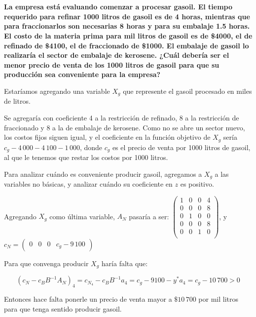 \documentclass[10pt,a4paper]{article}
\begin{document}
		\section{} %
		\textbf{La empresa está evaluando comenzar a procesar gasoil. El tiempo requerido para refinar 1000 litros de gasoil es de 4 horas, mientras que para fraccionarlos son necesarias 8 horas y para su embalaje 1.5 horas. El costo de la materia prima para mil litros de gasoil es de \$4000, el de refinado de \$4100, el de fraccionado de \$1000. El embalaje de gasoil lo realizaría el sector de embalaje de kerosene. ¿Cuál debería ser el menor precio de venta de los 1000 litros de gasoil para que su producción sea conveniente para la empresa?}
		
		\vspace{5mm}
		
		Estaríamos agregando una variable $X_g$ que represente el gasoil procesado en miles de litros.
		
		Se agregaría con coeficiente 4 a la restricción de refinado, 8 a la restricción de fraccionado y 8 a la de embalaje de kerosene. Como no se abre un sector nuevo, los costos fijos siguen igual, y el coeficiente en la función objetivo de $X_g$ sería $c_g - 4\,000 - 4\,100 - 1\,000$, donde $c_g$ es el precio de venta por 1000 litros de gasoil, al que le tenemos que restar los costos por 1000 litros.
		
		Para analizar cuándo es conveniente producir gasoil, agregamos a $X_g$ a las variables no básicas, y analizar cuándo su coeficiente en $z$ es positivo.
		
		Agregando $X_g$ como última variable, $A_N$ pasaría a ser: $\begin{pmatrix}
			1 & 0 & 0 & 4 \\
			0 & 0 & 0 & 8 \\
			0 & 1 & 0 & 0 \\
			0 & 0 & 0 & 8 \\
			0 & 0 & 1 & 0 \\
		\end{pmatrix}$, y $c_N = \begin{pmatrix}
			0 & 0 & 0 & c_g - 9\,100
		\end{pmatrix}$
		
		Para que convenga producir $X_g$ haría falta que:
		
		\[
		(c_N - c_B B^{-1} A_N)_4 = c_{N_4} - c_B B^{-1}a_4 = c_g - 9100 - y^* a_4 = c_g - 10\,700 > 0
		\]
		
		Entonces hace falta ponerle un precio de venta mayor a $\$10\,700$ por mil litros para que tenga sentido producir gasoil.
		
\end{document}
